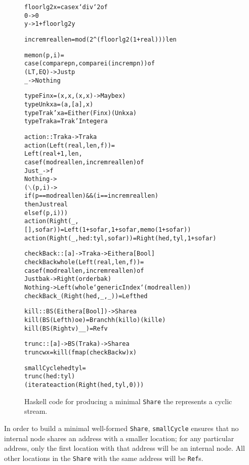 \documentclass[envcountsect]{llncs}
\newcommand{\share}{{\tt Share} }
\begin{document}
\begin{figure}
\begin{alltt}
floorlg2 x = case x `div` 2 of
               0 -> 0
               y -> 1 + floorlg2 y

increm real len = mod (2^(floorlg2 (1+real))) len

memo n (p,i) =
    case (compare p n, compare i (increm p n)) of
      (LT,EQ) -> Just p
      _ -> Nothing

type Fin x = (x,x,(x,x) -> Maybe x)
type Unk x a = (a,[a],x)
type Trak' x a = Either (Fin x) (Unk x a)
type Trak a = Trak' Integer a

action :: Trak a -> Trak a
action (Left (real,len,f)) =
    Left (real+1,len,
          case f (mod real len, increm real len) of
            Just _ -> f
            Nothing -> 
                (\(\backslash\)(p,i) ->
                 if (p == mod real len) && (i == increm real len)
                 then Just real
                 else f (p,i)))
action (Right (_,[],sofar)) = Left (1+sofar,1+sofar,memo (1+sofar))
action (Right (_,hed:tyl,sofar)) = Right (hed,tyl,1+sofar)

checkBack :: [a] -> Trak a -> Either a [Bool]
checkBack whole (Left (real,len,f)) =
    case f (mod real len,increm real len) of
      Just bak -> Right (order bak)
      Nothing -> Left (whole `genericIndex` (mod real len)) 
checkBack _ (Right (hed,_,_)) = Left hed

kill :: BS (Either a [Bool]) -> Share a
kill (BS (Left h) o e) = Branch h (kill o) (kill e)
kill (BS (Right v) _ _) = Ref v
    
trunc :: [a] -> BS (Trak a) -> Share a
trunc w x = kill (fmap (checkBack w) x)

smallCycle hed tyl =
  trunc (hed:tyl)
    (iterate action (Right (hed,tyl,0)))
\end{alltt}
\caption{Haskell code for producing a minimal \share the represents a cyclic stream.}
\label{cycleDetails}
\end{figure}

In order to build a minimal well-formed {\tt Share}, {\tt smallCycle} ensures that no internal node shares an address with a smaller location;
for any particular address, only the first location with that address will be an internal node.
All other locations in the \share with the same address will be {\tt Ref}s.
\end{document}
